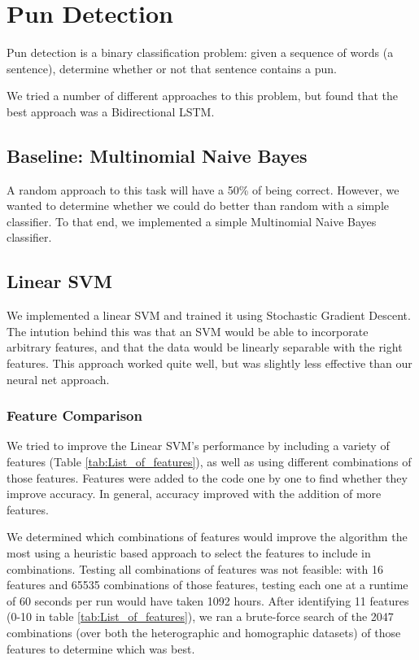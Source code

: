 \documentclass{article}
\begin{document}

\section{Pun Detection}\label{pun_detection}

Pun detection is a binary classification problem: given a sequence of words (a
sentence), determine whether or not that sentence contains a pun. 

We tried a number of different approaches to this problem, but found that the
best approach was a Bidirectional LSTM.

\subsection{Baseline: Multinomial Naive Bayes}

A random approach to this task will have a 50\% of being correct. However, we
wanted to determine whether we could do better than random with a simple
classifier. To that end, we implemented a simple Multinomial Naive Bayes
classifier. 

\subsection{Linear SVM}

We implemented a linear SVM and trained it using Stochastic Gradient Descent.
The intution behind this was that an SVM would be able to incorporate arbitrary
features, and that the data would be linearly separable with the right features.
This approach worked quite well, but was slightly less effective than our neural
net approach.

\subsubsection{Feature Comparison}

We tried to improve the Linear SVM's performance by including a variety of
features (Table \ref{tab:List_of_features}), as well as using different
combinations of those features.  Features were added to the code one by one to
find whether they improve accuracy. In general, accuracy improved with the
addition of more features.

We determined which combinations of features would improve the algorithm the
most using a heuristic based approach to select the features to include in
combinations. Testing all combinations of features was not feasible: with 16
features and 65535 combinations of those features, testing each one at a runtime
of 60 seconds per run would have taken 1092 hours. After identifying 11
features (0-10 in table \ref{tab:List_of_features}), we ran a brute-force search
of the 2047 combinations (over both the heterographic and homographic datasets)
of those features to determine which was best.
\end{document}
